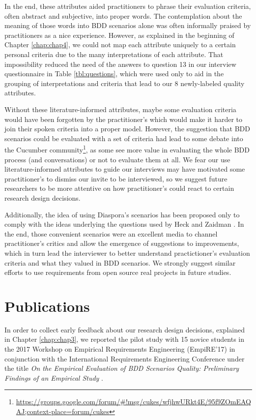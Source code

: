 In the end, these attributes aided practitioners to phrase their evaluation criteria, often abstract and subjective, into proper words. The contemplation about the meaning of those words into BDD scenarios alone was often informally praised by practitioners as a nice experience. However, as explained in the beginning of Chapter \ref{chap:chap4}, we could not map each attribute uniquely to a certain personal criteria due to the many interpretations of each attribute. That impossibility reduced the need of the answers to question 13 in our interview questionnaire in Table \ref{tbl:questions}, which were used only to aid in the grouping of interpretations and criteria that lead to our 8 newly-labeled quality attributes. 

Without these literature-informed attributes, maybe some evaluation criteria would have been forgotten by the practitioner's which would make it harder to join their spoken criteria into a proper model. However, the suggestion that BDD scenarios could be evaluated with a set of criteria had lead to some debate into the Cucumber community\footnote{\url{https://groups.google.com/forum/#!msg/cukes/wfjhwURkt4E/95f9ZOmEAQAJ;context-place=forum/cukes}}, as some see more value in evaluating the whole BDD process (and conversations) or not to evaluate them at all. We fear our use literature-informed attributes to guide our interviews may have motivated some practitioner's to dismiss our invite to be interviewed, so we suggest future researchers to be more attentive on how practitioner's could react to certain research design decisions.

Additionally, the idea of using Diaspora's scenarios has been proposed only to comply with the ideas underlying the questions used by Heck and Zaidman \cite{Heck_and_Zaidman_2017}. In the end, those convenient scenarios were an excellent media to channel practitioner's critics and allow the emergence of suggestions to improvements, which in turn lead the interviewer to better understand practictioner's evaluation criteria and what they valued in BDD scenarios. We strongly suggest similar efforts to use requirements from open source real projects in future studies.

\section{Publications}

In order to collect early feedback about our research design decisions, explained in Chapter \ref{chap:chap3}, we reported the pilot study with 15 novice students in the 2017 Workshop on Empirical Requirements Engineering (EmpiRE'17) in conjunction with the International Requirements Engineering Conference under the title \textit{On the Empirical Evaluation of BDD Scenarios Quality: Preliminary Findings of an Empirical Study} \cite{Empire_2017}. 

